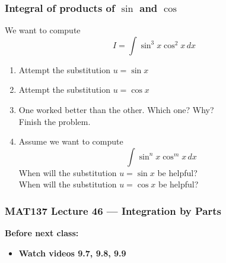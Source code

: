 \documentclass[14pt]{beamer}
\newcommand{\p}{\pause}
\newcommand{\setsize}[1]{\fontsize{#1}{#1}\selectfont} %
\newcommand{\smallerfont}{\setsize{13}} %
\begin{document}
	\begin{frame}[t]
		\smallerfont
		\frametitle{Integral of products of $\sin$ and $\cos$}
		We want to compute
		\vspace{-.5cm}
		\[
			I = \int \sin^{3} x \cos^{2} x \, dx
		\]

		\begin{enumerate}
			\item Attempt the substitution ${\displaystyle u = \sin x}$

			\item Attempt the substitution ${\displaystyle u = \cos x}$

			\item One worked better than the other. Which one? Why? \\ Finish the
				problem. \p

			\item Assume we want to compute
				\[
					\int \sin^{n}x \cos^{m}x \, dx
				\]
				When will the substitution ${\displaystyle u = \sin x}$ be helpful? \\
				When will the substitution ${\displaystyle u = \cos x}$ be helpful?
		\end{enumerate}
	\end{frame}


\begin{frame}
	\frametitle{MAT137 Lecture 46 --- Integration by Parts}

	\vfill
	{\bf Before next class:}
		\begin{itemize} \normalsize
			\item {\bf Watch videos 9.7, 9.8, 9.9}
		\end{itemize}
\end{frame}
\end{document}

